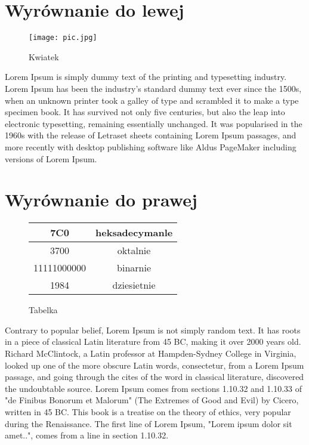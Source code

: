 \documentclass[a4paper,12pt]{article}
\begin{document}
	
	\section{Wyrównanie do lewej}
	\begin{wrapfigure}{l}{0.5\textwidth}
		\texttt{[image: pic.jpg]}
		\caption{Kwiatek}
	\end{wrapfigure}
	Lorem Ipsum is simply dummy text of the printing and typesetting industry. Lorem Ipsum has been the industry's standard dummy text ever since the 1500s, when an unknown printer took a galley of type and scrambled it to make a type specimen book. It has survived not only five centuries, but also the leap into electronic typesetting, remaining essentially unchanged. It was popularised in the 1960s with the release of Letraset sheets containing Lorem Ipsum passages, and more recently with desktop publishing software like Aldus PageMaker including versions of Lorem Ipsum.
	
	
	\section{Wyrównanie do prawej}
	\begin{wrapfigure}{r}{0.5\textwidth}
		\begin{tabular}{ |c|c| }
			\hline
			\multirow{1}{7em}{7C0} & heksadecymanle \\ 
			\hline
			\multirow{1}{7em}{3700} & oktalnie  \\ 
			\hline	
			\multirow{1}{7em}{11111000000} & binarnie \\
			\hline
			\hline
			\multirow{1}{7em}{1984} & dziesietnie \\	
			\hline
		\end{tabular}
		\caption{Tabelka}
	\end{wrapfigure}
	Contrary to popular belief, Lorem Ipsum is not simply random text. It has roots in a piece of classical Latin literature from 45 BC, making it over 2000 years old. Richard McClintock, a Latin professor at Hampden-Sydney College in Virginia, looked up one of the more obscure Latin words, consectetur, from a Lorem Ipsum passage, and going through the cites of the word in classical literature, discovered the undoubtable source. Lorem Ipsum comes from sections 1.10.32 and 1.10.33 of "de Finibus Bonorum et Malorum" (The Extremes of Good and Evil) by Cicero, written in 45 BC. This book is a treatise on the theory of ethics, very popular during the Renaissance. The first line of Lorem Ipsum, "Lorem ipsum dolor sit amet..", comes from a line in section 1.10.32.
	
\end{document}
